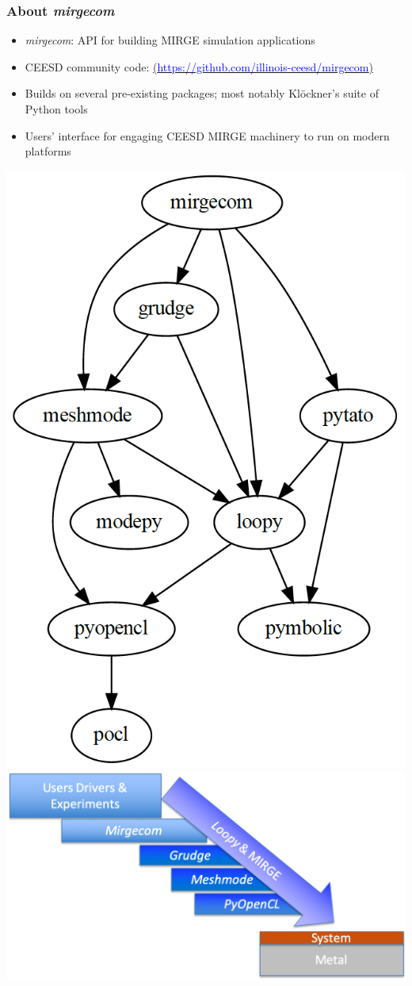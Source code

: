 \begin{frame}\frametitle{About \textit{mirgecom}}
\begin{multicols}{2}
\begin{itemize}
  \item \textit{mirgecom}: API for building MIRGE simulation applications
  \item CEESD community code: \href{https://github.com/illinois-ceesd/mirgecom}{(\textcolor{blue}{https://github.com/illinois-ceesd/mirgecom})}
  \item Builds on several pre-existing packages; most notably Kl{\"o}ckner's suite of Python tools
  \item Users' interface for engaging CEESD MIRGE machinery to run on modern platforms
\end{itemize}
\end{multicols}
\begin{multicols}{2}
\hspace{.6in}
\includegraphics[width=.25\textwidth]{figures/MirgecomPackageTree.png}
\hspace{-.4in}
\vspace{-.2in}
\includegraphics[width=.5\textwidth]{figures/mirgecom_cartoon.png}
\end{multicols}
\end{frame}

